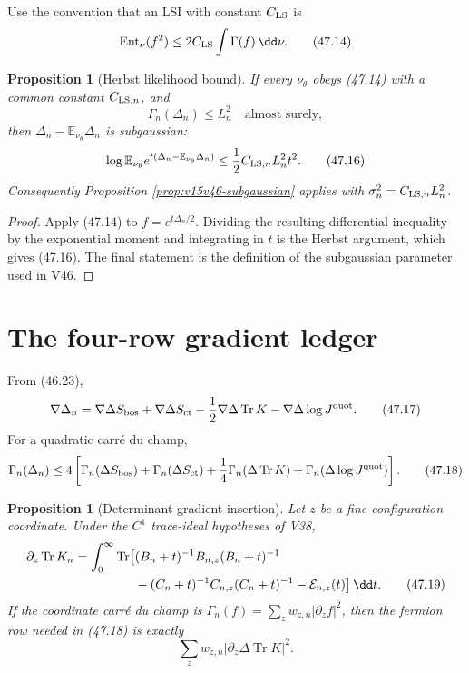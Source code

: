 \documentclass[11pt]{article}
\newtheorem{proposition}[theorem]{Proposition}
\theoremstyle{remark}
\begin{document}
Use the convention that an LSI with constant \(C_{\rm LS}\) is
\[
 \operatorname{Ent}_\nu(f^2)
 \leq2C_{\rm LS}\int\Gamma(f)\,\dd\nu.                  \tag{47.14}
\]

\begin{proposition}[Herbst likelihood bound]
\label{prop:v15v47-herbst}
If every \(\nu_\theta\) obeys (47.14) with a common constant
\(C_{{\rm LS},n}\), and
\[
 \Gamma_n(\Delta_n)\leq L_n^2
 \quad\text{almost surely},                             \tag{47.15}
\]
then \(\Delta_n-\mathbb E_{\nu_\theta}\Delta_n\) is
subgaussian:
\[
 \log\mathbb E_{\nu_\theta}
 e^{t(\Delta_n-\mathbb E_{\nu_\theta}\Delta_n)}
 \leq\frac12C_{{\rm LS},n}L_n^2t^2.                    \tag{47.16}
\]
Consequently Proposition \ref{prop:v15v46-subgaussian} applies with
\(\sigma_n^2=C_{{\rm LS},n}L_n^2\).
\end{proposition}

\begin{proof}
Apply (47.14) to
\(f=e^{t\Delta_n/2}\).  Dividing the resulting differential
inequality by the exponential moment and integrating in \(t\) is
the Herbst argument, which gives (47.16).  The final statement is
the definition of the subgaussian parameter used in V46.
\end{proof}

\section{The four-row gradient ledger}

From (46.23),
\[
 \nabla\Delta_n=
 \nabla\Delta S_{\rm bos}
 +\nabla\Delta S_{\rm ct}
 -\frac12\nabla\Delta\operatorname{Tr}K
 -\nabla\Delta\log J^{\rm quot}.                        \tag{47.17}
\]
For a quadratic carré du champ,
\[
 \Gamma_n(\Delta_n)
 \leq4\left[
 \Gamma_n(\Delta S_{\rm bos})
 +\Gamma_n(\Delta S_{\rm ct})
 +\frac14\Gamma_n(\Delta\operatorname{Tr}K)
 +\Gamma_n(\Delta\log J^{\rm quot})
 \right].                                               \tag{47.18}
\]

\begin{proposition}[Determinant-gradient insertion]
\label{prop:v15v47-det-gradient}
Let \(z\) be a fine configuration coordinate.  Under the \(C^1\)
trace-ideal hypotheses of V38,
\[
 \begin{split}
 \partial_z\operatorname{Tr}K_n
 =\int_0^\infty\operatorname{Tr}\bigl[
 &(B_n+t)^{-1}B_{n,z}(B_n+t)^{-1}\\
 &-(C_n+t)^{-1}C_{n,z}(C_n+t)^{-1}
 -{\cal E}_{n,z}(t)\bigr]\,\dd t.                       \tag{47.19}
 \end{split}
\]
If the coordinate carré du champ is
\(\Gamma_n(f)=\sum_z w_{z,n}|\partial_zf|^2\), then the fermion row
needed in (47.18) is exactly
\[
 \sum_z w_{z,n}
 \left|\partial_z\Delta\operatorname{Tr}K\right|^2.     \tag{47.20}
\]
\end{proposition}
\end{document}
